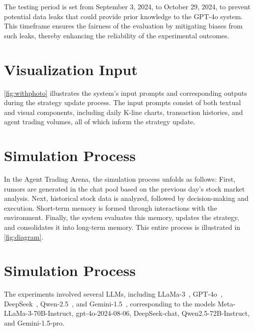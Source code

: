 The testing period is set from September 3, 2024, to October 29, 2024, to prevent potential data leaks that could provide prior knowledge to the GPT-4o system. This timeframe ensures the fairness of the evaluation by mitigating biases from such leaks, thereby enhancing the reliability of the experimental outcomes.

\section{Visualization Input}
\label{appendix_D} 

\autoref{fig:withphoto} illustrates the system's input prompts and corresponding outputs during the strategy update process. The input prompts consist of both textual and visual components, including daily K-line charts, transaction histories, and agent trading volumes, all of which inform the strategy update.

\section{Simulation Process}
\label{appendix_E} 

In the Agent Trading Arena, the simulation process unfolds as follows: First, rumors are generated in the chat pool based on the previous day's stock market analysis. Next, historical stock data is analyzed, followed by decision-making and execution. Short-term memory is formed through interactions with the environment. Finally, the system evaluates this memory, updates the strategy, and consolidates it into long-term memory. This entire process is illustrated in \autoref{fig:diagram}.

\section{Simulation Process}
\label{appendix_F}

The experiments involved several LLMs, including LLaMa-3~\citep{LLaMa3}, GPT-4o~\citep{GPT4o}, DeepSeek~\citep{DeepSeek3v}, Qwen-2.5~\citep{qwen2.5}, and Gemini-1.5~\citep{Gemini1.5}, corresponding to the models Meta-LLaMa-3-70B-Instruct, gpt-4o-2024-08-06, DeepSeek-chat, Qwen2.5-72B-Instruct, and Gemini-1.5-pro.
